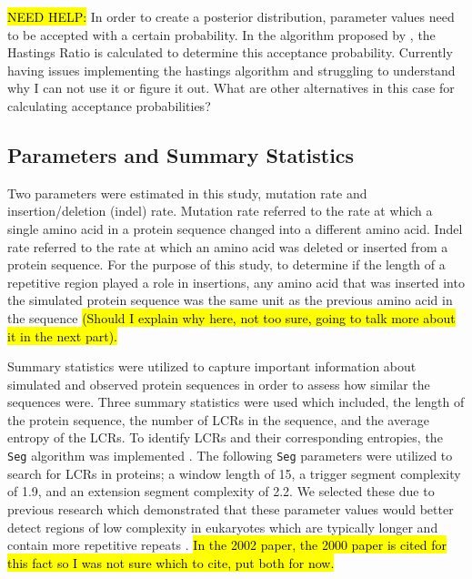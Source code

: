 \documentclass{article}
\begin{document}
\hl{NEED HELP:} In order to create a posterior distribution, parameter values need to be accepted with a certain probability. In the algorithm proposed by \citet{marjoram2003markov}, the Hastings Ratio is calculated to determine this acceptance probability. Currently having issues implementing the hastings algorithm and struggling to understand why I can not use it or figure it out. What are other alternatives in this case for calculating acceptance probabilities?

\subsection{Parameters and Summary Statistics}

Two parameters were estimated in this study, mutation rate and insertion/deletion (indel) rate. Mutation rate referred to the rate at which a single amino acid in a protein sequence changed into a different amino acid. Indel rate referred to the rate at which an amino acid was deleted or inserted from a protein sequence. For the purpose of this study, to determine if the length of a repetitive region played a role in insertions, any amino acid that was inserted into the simulated protein sequence was the same unit as the previous amino acid in the sequence \hl{(Should I explain why here, not too sure, going to talk more about it in the next part).}

Summary statistics were utilized to capture important information about simulated and observed protein sequences in order to assess how similar the sequences were. Three summary statistics were used which included, the length of the protein sequence, the number of LCRs in the sequence, and the average entropy of the LCRs. To identify LCRs and their corresponding entropies, the \texttt{Seg} algorithm was implemented \citep{wootton1993statistics}. The following \texttt{Seg} parameters were utilized to search for LCRs in proteins; a window length of 15, a trigger segment complexity of 1.9, and an extension segment complexity of 2.2. We selected these due to previous research which demonstrated that these parameter values would better detect regions of low complexity in eukaryotes which are typically longer and contain more repetitive repeats \citep{huntley2000evolution, huntley2002simple}. \hl{In the 2002 paper, the 2000 paper is cited for this fact so I was not sure which to cite, put both for now.}
\end{document}
